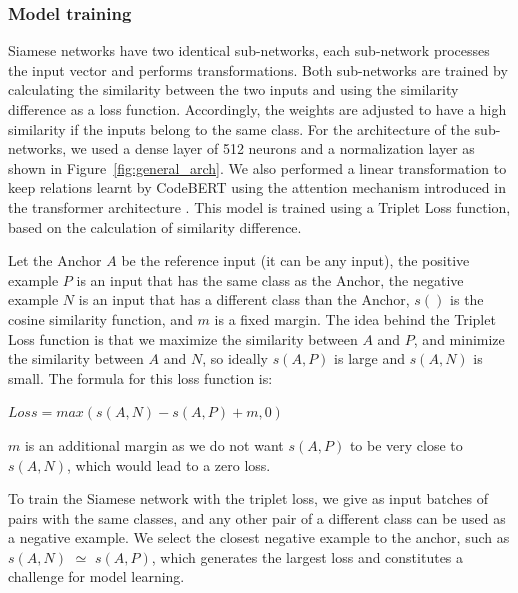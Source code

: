 \subsubsection{Model training}

Siamese networks have two identical sub-networks, each sub-network processes the input vector and performs transformations.
Both sub-networks are trained by calculating the similarity between the two inputs and using the similarity difference as a loss function.
Accordingly, the weights are adjusted to have a high similarity if the inputs belong to the same class. For the architecture of the sub-networks, we used a dense layer of 512 neurons and a normalization layer as shown in Figure~\ref{fig:general_arch}.
We also performed a linear transformation to keep relations learnt by CodeBERT using the attention mechanism introduced in the transformer architecture \cite{transformer}. 
This model is trained using a Triplet Loss function, based on the calculation of similarity difference.

Let the Anchor $A$ be the reference input (it can be any input), the positive example $P$ is an input that has the same class as the Anchor, the negative example $N$ is an input that has a different class than the Anchor, $s()$ is the cosine similarity function, and $m$ is a fixed margin. The idea behind the Triplet Loss function is that we maximize the similarity between $A$ and $P$, and minimize the similarity between $A$ and $N$, so ideally $s(A, P)$ is large and $s(A, N)$ is small. The formula for this loss function is: 

\begin{center}
\( Loss = max(s(A, N) - s(A, P) + m, 0) \)
\end{center}

$m$ is an additional margin as we do not want $s(A, P)$ to be very close to $s(A, N)$, which would lead to a zero loss. 

To train the Siamese network with the triplet loss, we give as input batches of pairs with the same classes, and any other pair of a different class can be used as a negative example. We select the closest negative example to the anchor, such as $s(A,  N)$ $\simeq$ $s(A, P)$, which generates the largest loss and constitutes a challenge for model learning. 